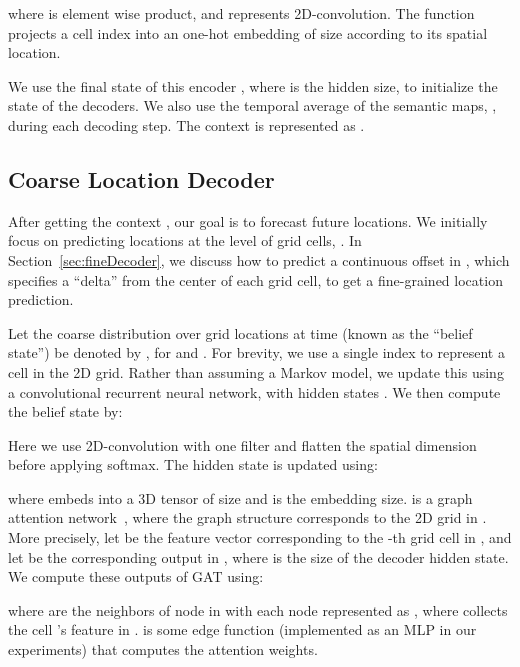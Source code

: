 \documentclass[10pt,twocolumn,letterpaper]{article}
\newcommand{\eat}[1]{}
\begin{document}
where
 is element wise product, 
and  represents 2D-convolution. The function  projects a cell index into an one-hot embedding of size  according to its spatial location.
\eat{ We concatenate the final state of this encoder,
together with the temporal average of the semantic maps,
,
as the representation of the context .
}
We use the final state of this encoder , where  is the hidden size, to initialize the state of the decoders. 
We also use the temporal average of the semantic maps,
, during each decoding step.
The context is represented as .

\vspace{-1mm}
\subsection{Coarse Location Decoder}
\vspace{-1mm}
After getting the context , our goal is to forecast future locations.
We initially focus on predicting locations
at the level of grid cells, .
In Section~\ref{sec:fineDecoder}, 
we discuss how to predict a continuous offset in , which specifies a ``delta''
from the center of each grid cell, to get a fine-grained location prediction.



\eat{

}
Let the coarse
distribution over grid
locations at time  (known as the ``belief state'') be denoted by
,
for  and . For brevity, we use a single
index  to represent a cell in the 2D grid.
Rather than assuming a Markov model,
we update this using a 
convolutional recurrent neural network,
with hidden states .
We then compute the belief state by:

Here we use 2D-convolution with one filter and flatten the spatial dimension before applying softmax.
The hidden state is updated using:

where
 embeds into a 3D tensor of size  and  is the embedding size.
 is a 
graph attention network~\cite{velivckovic2017graph},
where the graph structure corresponds to the 2D grid in .
More precisely,
let  be the feature vector corresponding
to the -th grid cell in ,
and let  be the 
corresponding output
in
, where  is the size of the decoder hidden state.
We compute these outputs of GAT using:

where  are the neighbors of node  in  with each node represented as 
, where  collects the cell 's feature in .
 is some edge function (implemented as an MLP in our experiments) that computes the attention weights.
\end{document}
